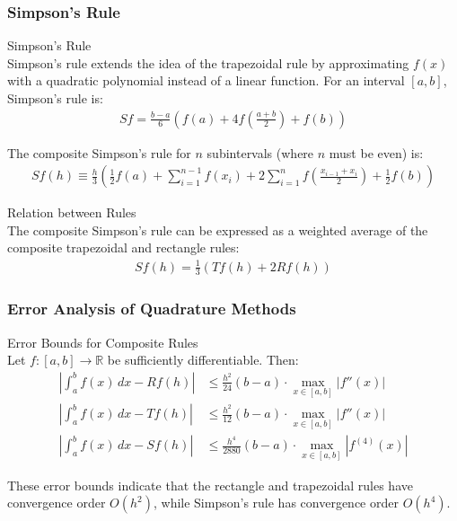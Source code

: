 \subsubsection{Simpson's Rule}

\begin{definition}{Simpson's Rule}\\
Simpson's rule extends the idea of the trapezoidal rule by approximating $f(x)$ with a quadratic polynomial instead of a linear function. For an interval $[a,b]$, Simpson's rule is:
\begin{align*}
Sf = \frac{b-a}{6}\left(f(a) + 4f\left(\frac{a+b}{2}\right) + f(b)\right)
\end{align*}

The composite Simpson's rule for $n$ subintervals (where $n$ must be even) is:
\begin{align*}
Sf(h) \equiv \frac{h}{3}\left(\frac{1}{2}f(a) + \sum_{i=1}^{n-1} f(x_i) + 2\sum_{i=1}^{n} f\left(\frac{x_{i-1} + x_i}{2}\right) + \frac{1}{2}f(b)\right)
\end{align*}
\end{definition}

\begin{theorem}{Relation between Rules}\\
The composite Simpson's rule can be expressed as a weighted average of the composite trapezoidal and rectangle rules:
\begin{align*}
Sf(h) = \frac{1}{3}(Tf(h) + 2Rf(h))
\end{align*}
\end{theorem}

\subsubsection{Error Analysis of Quadrature Methods}

\begin{theorem}{Error Bounds for Composite Rules}\\
Let $f: [a,b] \rightarrow \mathbb{R}$ be sufficiently differentiable. Then:
\begin{align*}
\left|\int_a^b f(x) \, dx - Rf(h)\right| &\leq \frac{h^2}{24}(b-a) \cdot \max_{x\in[a,b]}|f''(x)|\\
\left|\int_a^b f(x) \, dx - Tf(h)\right| &\leq \frac{h^2}{12}(b-a) \cdot \max_{x\in[a,b]}|f''(x)|\\
\left|\int_a^b f(x) \, dx - Sf(h)\right| &\leq \frac{h^4}{2880}(b-a) \cdot \max_{x\in[a,b]}|f^{(4)}(x)|
\end{align*}

These error bounds indicate that the rectangle and trapezoidal rules have convergence order $O(h^2)$, while Simpson's rule has convergence order $O(h^4)$.
\end{theorem}

